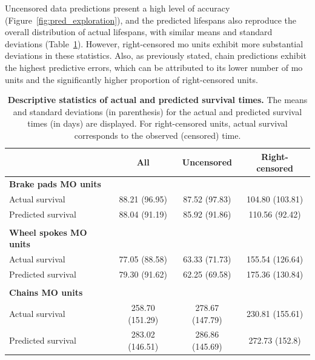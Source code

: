     Uncensored data predictions present a high level of accuracy (Figure~\ref{fig:pred_exploration}), and the predicted lifespans also reproduce the overall distribution of actual lifespans, with similar means and standard deviations (Table~\ref{tab:actual_vs_pred_descriptive}). However, right-censored \ac{mo} units exhibit more substantial deviations in these statistics. Also, as previously stated, chain predictions exhibit the highest predictive errors, which can be attributed to its lower number of \ac{mo} units and the significantly higher proportion of right-censored units.

    \begin{table}[htbp!]
        \centering
        \footnotesize
        \caption[Descriptive statistics of actual and predicted survival times]{
            \textbf{Descriptive statistics of actual and predicted survival times.} 
            The means and standard deviations (in parenthesis) for the actual and predicted survival times (in days) are displayed. For right-censored units, actual survival corresponds to the observed (censored) time.
        }
        \label{tab:actual_vs_pred_descriptive}
        \begin{tabular}{@{}lccc@{}}
            \toprule
                                & {All}           & {Uncensored}    & {Right-censored} \\
            \midrule
            \textbf{Brake pads MO units}                                              \\
            Actual survival    & 88.21 (96.95)   & 87.52 (97.83)   & 104.80 (103.81)  \\
            Predicted survival & 88.04 (91.19)   & 85.92 (91.86)   & 110.56 (92.42)   \\  \\
        
            \textbf{Wheel spokes MO units}                                            \\
            Actual survival    & 77.05 (88.58)   & 63.33 (71.73)   & 155.54 (126.64)  \\
            Predicted survival & 79.30 (91.62)   & 62.25 (69.58)   & 175.36 (130.84)  \\  \\
        
            \textbf{Chains MO units}                                                  \\
            Actual survival    & 258.70 (151.29) & 278.67 (147.79) & 230.81 (155.61)  \\
            Predicted survival & 283.02 (146.51) & 286.86 (145.69) & 272.73 (152.8)   \\
            \bottomrule
        \end{tabular}
        \end{table}

